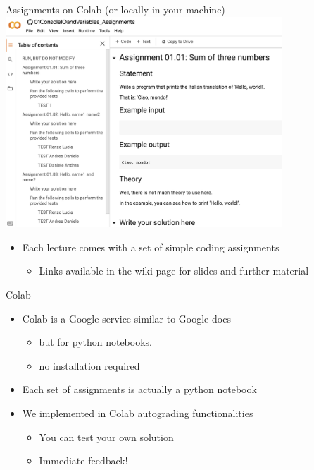 \documentclass{beamer}%
\begin{document}
\begin{frame}{Assignments on Colab (or locally in your machine)}
	\centering 
	\includegraphics[width=0.78\textwidth]{figures/colab1}
	\begin{itemize}
		\item Each lecture comes with a set of simple coding assignments
		\begin{itemize}
			\item Links available in the wiki page for slides and further material
		\end{itemize}
	\end{itemize}
\end{frame}

\begin{frame}{Colab}
	\centering 
	\begin{itemize}
		\item Colab is a Google service similar to Google docs 
		\begin{itemize}
			\item but for python notebooks.
			\item no installation required
		\end{itemize}	
		\item Each set of assignments is actually a python notebook
		\item We implemented in Colab autograding functionalities
		\begin{itemize}
			\item You can test your own solution
			\item Immediate feedback!
		\end{itemize}	
	\end{itemize}
\end{frame}
\end{document}
